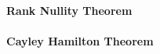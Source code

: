
\paragraph{Rank Nullity Theorem}


\paragraph{Cayley Hamilton Theorem}









\begin{comment}
Explain what happens to the eigenvalues when we do certain things to a matrix (shifts, etc.)
I have a list of that in some text file. Shifting eigenvalues and manipulating them in other ways
can be important to improve convergence of numerical algrithms

Other possibly relevant matrix types to mention:
https://en.wikipedia.org/wiki/Companion_matrix
https://en.wikipedia.org/wiki/Smith_normal_form

\end{comment}